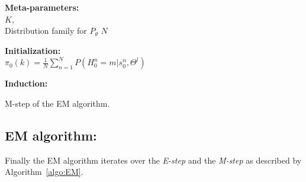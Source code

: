 \documentclass[a4paper,11pt]{report}
\begin{document}
			\begin{center}
				\begin{algorithm}
					\textbf{Meta-parameters:}\\
						$K$,\\
						Distribution family for $P_{\theta}$ 
						$N$ 
							
					\textbf{Initialization:}\\
						$\pi_{0}(k) = \frac{1}{N} \sum_{n=1}^{N} P(H_{0}^{n}=m|s_{0}^{n},\Theta^{l})$
							
					\textbf{Induction:}\\
					\caption{M-step of the EM algorithm.}
					\label{algo:Mstep}
				\end{algorithm}        
			\end{center}
			
		\subsection{EM algorithm:}
			\label{subsec:SCHMT/Learning/EM}
			
			Finally the EM algorithm iterates over the \textit{E-step} and the \textit{M-step} as described by Algorithm~\ref{algo:EM}.
			
\end{document}

